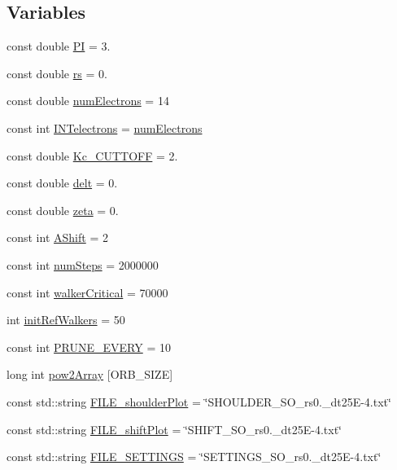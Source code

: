 \subsection*{Variables}
\begin{DoxyCompactItemize}
\item 
const double \hyperlink{UEG__MAIN__binarytest_8C_a952eac791b596a61bba0a133a3bb439f}{P\-I} = 3.
\item 
const double \hyperlink{UEG__MAIN__binarytest_8C_a363ad74e3d4570cd6bfaa4622e0af0bd}{rs} = 0.
\item 
const double \hyperlink{UEG__MAIN__binarytest_8C_a613e167ad809e33c73b70a24822cc6f9}{num\-Electrons} = 14
\item 
const int \hyperlink{UEG__MAIN__binarytest_8C_ace3e2699d268bc86fda1a7a41270c49e}{I\-N\-Telectrons} = \hyperlink{UEG__MAIN__binarytest_8C_a613e167ad809e33c73b70a24822cc6f9}{num\-Electrons}
\item 
const double \hyperlink{UEG__MAIN__binarytest_8C_aa8c8c523b8aaaef95263171d9b078d8d}{Kc\-\_\-\-C\-U\-T\-T\-O\-F\-F} = 2.
\item 
const double \hyperlink{UEG__MAIN__binarytest_8C_aa06f5594efa32a5569766c36690b4a22}{delt} = 0.
\item 
const double \hyperlink{UEG__MAIN__binarytest_8C_a50fb6782013c8c12243ca553cee0971a}{zeta} = 0.
\item 
const int \hyperlink{UEG__MAIN__binarytest_8C_a1b1b50ff28122bf25bbd141938893243}{A\-Shift} = 2
\item 
const int \hyperlink{UEG__MAIN__binarytest_8C_a957840dbdbfa8a29c76754be143dd02f}{num\-Steps} = 2000000
\item 
const int \hyperlink{UEG__MAIN__binarytest_8C_a6c7e0fd46bc659f43a5e2fe841b0aeeb}{walker\-Critical} = 70000
\item 
int \hyperlink{UEG__MAIN__binarytest_8C_a5481ef8ba617908ce12828cc4a8c45a3}{init\-Ref\-Walkers} = 50
\item 
const int \hyperlink{UEG__MAIN__binarytest_8C_aecb8ec6a7a5a3e737bef25336ec80927}{P\-R\-U\-N\-E\-\_\-\-E\-V\-E\-R\-Y} = 10
\item 
long int \hyperlink{UEG__MAIN__binarytest_8C_a5a4a522e121fab9651a940cabf5ac77d}{pow2\-Array} \mbox{[}O\-R\-B\-\_\-\-S\-I\-Z\-E\mbox{]}
\item 
const std\-::string \hyperlink{UEG__MAIN__binarytest_8C_a707c8ad6d9aee200d8624eae87e2299f}{F\-I\-L\-E\-\_\-shoulder\-Plot} = \char`\"{}S\-H\-O\-U\-L\-D\-E\-R\-\_\-S\-O\-\_\-rs0.\-\_\-dt25\-E-\/4.txt\char`\"{}
\item 
const std\-::string \hyperlink{UEG__MAIN__binarytest_8C_a8947574152f3a6b27e38b1f5ea8f61de}{F\-I\-L\-E\-\_\-shift\-Plot} = \char`\"{}S\-H\-I\-F\-T\-\_\-S\-O\-\_\-rs0.\-\_\-dt25\-E-\/4.txt\char`\"{}
\item 
const std\-::string \hyperlink{UEG__MAIN__binarytest_8C_aa87b0f6d11261495ace185e6d5fcdcb5}{F\-I\-L\-E\-\_\-\-S\-E\-T\-T\-I\-N\-G\-S} = \char`\"{}S\-E\-T\-T\-I\-N\-G\-S\-\_\-S\-O\-\_\-rs0.\-\_\-dt25\-E-\/4.txt\char`\"{}
\end{DoxyCompactItemize}



